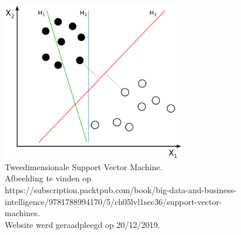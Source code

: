 	
	\begin{figure}
		\centering
		\includegraphics[width=80mm]{afbeeldingen/supportVectorMachines.PNG}
		\caption{Tweedimensionale Support Vector Machine. \\Afbeelding te vinden op https://subscription.packtpub.com/book/big-data-and-business-intelligence/9781788994170/5/ch05lvl1sec36/support-vector-machines.\\ Website werd geraadpleegd op 20/12/2019.}
		\label{fig:supportVectorMachines}
	\end{figure}
		
			
